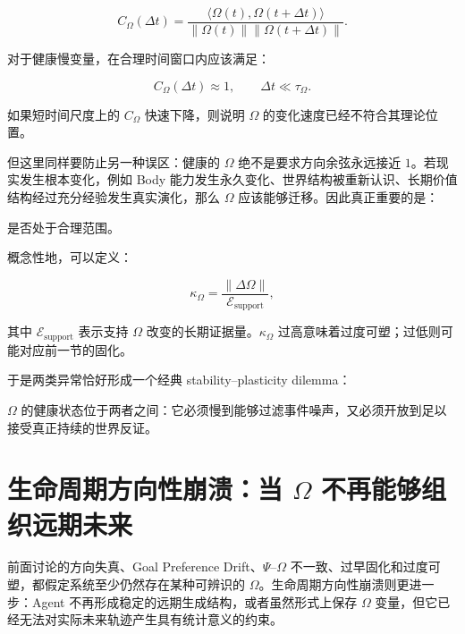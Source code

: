 \[
C_{\Omega}(\Delta t)
=
\frac{
\langle
\Omega(t),\Omega(t+\Delta t)
\rangle
}{
\|\Omega(t)\|
\|\Omega(t+\Delta t)\|
}.
\]

对于健康慢变量，在合理时间窗口内应该满足：

\[
C_{\Omega}(\Delta t)
\approx1,
\qquad
\Delta t\ll\tau_\Omega.
\]

如果短时间尺度上的 $C_\Omega$ 快速下降，则说明 $\Omega$ 的变化速度已经不符合其理论位置。

但这里同样要防止另一种误区：健康的 $\Omega$ 绝不是要求方向余弦永远接近 $1$。若现实发生根本变化，例如 Body 能力发生永久变化、世界结构被重新认识、长期价值结构经过充分经验发生真实演化，那么 $\Omega$ 应该能够迁移。因此真正重要的是：

\begin{statementbox}
\centering
{}
\end{statementbox}

是否处于合理范围。

概念性地，可以定义：

\[
\kappa_{\Omega}
=
\frac{
\|\Delta\Omega\|
}{
\mathcal E_{\mathrm{support}}
},
\]

其中 $\mathcal E_{\mathrm{support}}$ 表示支持 $\Omega$ 改变的长期证据量。$\kappa_\Omega$ 过高意味着过度可塑；过低则可能对应前一节的固化。

于是两类异常恰好形成一个经典 stability--plasticity dilemma：

\begin{statementbox}
\centering
{}
\end{statementbox}

$\Omega$ 的健康状态位于两者之间：它必须慢到能够过滤事件噪声，又必须开放到足以接受真正持续的世界反证。

\section{生命周期方向性崩溃：当 $\Omega$ 不再能够组织远期未来}
\label{sec:omega_direction_collapse}

前面讨论的方向失真、Goal Preference Drift、$\Psi$--$\Omega$ 不一致、过早固化和过度可塑，都假定系统至少仍然存在某种可辨识的 $\Omega$。生命周期方向性崩溃则更进一步：Agent 不再形成稳定的远期生成结构，或者虽然形式上保存 $\Omega$ 变量，但它已经无法对实际未来轨迹产生具有统计意义的约束。

